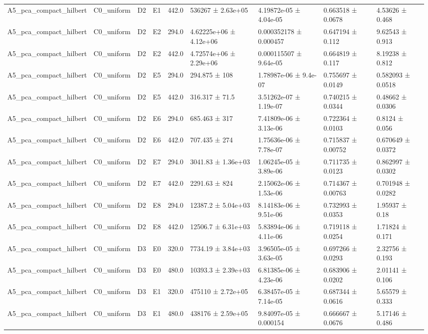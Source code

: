 \begin{table}
\begin{tabular}{lllllllll}
A5\_pca\_compact\_hilbert & C0\_uniform & D2 & E1 & 442.0 & 536267 ± 2.63e+05 & 4.19872e-05 ± 4.04e-05 & 0.663518 ± 0.0678 & 4.53626 ± 0.468 \\
A5\_pca\_compact\_hilbert & C0\_uniform & D2 & E2 & 294.0 & 4.62225e+06 ± 4.12e+06 & 0.000352178 ± 0.000457 & 0.647194 ± 0.112 & 9.62543 ± 0.913 \\
A5\_pca\_compact\_hilbert & C0\_uniform & D2 & E2 & 442.0 & 4.72574e+06 ± 2.29e+06 & 0.000115507 ± 9.64e-05 & 0.664819 ± 0.117 & 8.19238 ± 0.812 \\
A5\_pca\_compact\_hilbert & C0\_uniform & D2 & E5 & 294.0 & 294.875 ± 108 & 1.78987e-06 ± 9.4e-07 & 0.755697 ± 0.0149 & 0.582093 ± 0.0518 \\
A5\_pca\_compact\_hilbert & C0\_uniform & D2 & E5 & 442.0 & 316.317 ± 71.5 & 3.51262e-07 ± 1.19e-07 & 0.740215 ± 0.0344 & 0.48662 ± 0.0306 \\
A5\_pca\_compact\_hilbert & C0\_uniform & D2 & E6 & 294.0 & 685.463 ± 317 & 7.41809e-06 ± 3.13e-06 & 0.722364 ± 0.0103 & 0.8124 ± 0.056 \\
A5\_pca\_compact\_hilbert & C0\_uniform & D2 & E6 & 442.0 & 707.435 ± 274 & 1.75636e-06 ± 7.78e-07 & 0.715837 ± 0.00752 & 0.670649 ± 0.0372 \\
A5\_pca\_compact\_hilbert & C0\_uniform & D2 & E7 & 294.0 & 3041.83 ± 1.36e+03 & 1.06245e-05 ± 3.89e-06 & 0.711735 ± 0.0123 & 0.862997 ± 0.0302 \\
A5\_pca\_compact\_hilbert & C0\_uniform & D2 & E7 & 442.0 & 2291.63 ± 824 & 2.15062e-06 ± 1.53e-06 & 0.714367 ± 0.00763 & 0.701948 ± 0.0282 \\
A5\_pca\_compact\_hilbert & C0\_uniform & D2 & E8 & 294.0 & 12387.2 ± 5.04e+03 & 8.14183e-06 ± 9.51e-06 & 0.732993 ± 0.0353 & 1.95937 ± 0.18 \\
A5\_pca\_compact\_hilbert & C0\_uniform & D2 & E8 & 442.0 & 12506.7 ± 6.31e+03 & 5.83894e-06 ± 4.11e-06 & 0.719118 ± 0.0254 & 1.71824 ± 0.171 \\
A5\_pca\_compact\_hilbert & C0\_uniform & D3 & E0 & 320.0 & 7734.19 ± 3.84e+03 & 3.96505e-05 ± 3.63e-05 & 0.697266 ± 0.0293 & 2.32756 ± 0.193 \\
A5\_pca\_compact\_hilbert & C0\_uniform & D3 & E0 & 480.0 & 10393.3 ± 2.39e+03 & 6.81385e-06 ± 4.23e-06 & 0.683906 ± 0.0202 & 2.01141 ± 0.106 \\
A5\_pca\_compact\_hilbert & C0\_uniform & D3 & E1 & 320.0 & 475110 ± 2.72e+05 & 6.38457e-05 ± 7.14e-05 & 0.687344 ± 0.0616 & 5.65579 ± 0.333 \\
A5\_pca\_compact\_hilbert & C0\_uniform & D3 & E1 & 480.0 & 438176 ± 2.59e+05 & 9.84097e-05 ± 0.000154 & 0.666667 ± 0.0676 & 5.17146 ± 0.486 \\

\end{tabular}
\end{table}
